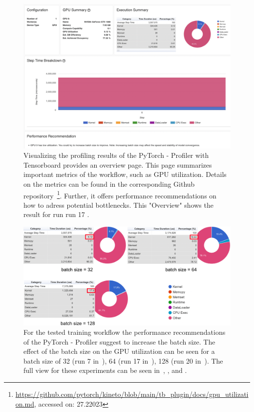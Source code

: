 \documentclass[12pt, a4paper, hidelinks]{article}
\begin{document}
\begin{figure}[H]
\centering
\includegraphics[width=1\textwidth]{./assets/scap_gtx1080_profiler-torch_14650076}
\caption[PyTorch - Profiler: Overview]{Visualizing the profiling results of the PyTorch - Profiler with Tensorboard provides an overview page. This page summarizes important metrics of the workflow, such as \ac{GPU} utilization. Details on the metrics can be found in the corresponding Github repository~\footnote{\url{https://github.com/pytorch/kineto/blob/main/tb_plugin/docs/gpu_utilization.md}, accessed on: 27.22023}. Further, it offers performance recommendations on how to adress potential bottlenecks. This "Overview" shows the result for run run 17 .}
\label{fig:scap_gtx1080_profiler-torch_14650076}
\end{figure}

\begin{figure}[H]
\centering
\includegraphics[width=1\textwidth]{./assets/scap_gtx1080_profiler-torch_comparison-batch-size}
\caption[PyTorch - Profiler: Performance Recommendation]{For the tested training workflow the performance recommendations of the PyTorch - Profiler suggest to increase the batch size. The effect of the batch size on the \ac{GPU} utilization can be seen for a batch size of 32 (run 7 in~), 64 (run 17 in~), 128 (run 20 in~). The full view for these experiments can be seen in~, , and .}
\label{fig:scap_gtx1080_profiler-torch_comparison-batch-size}
\end{figure}
\end{document}

